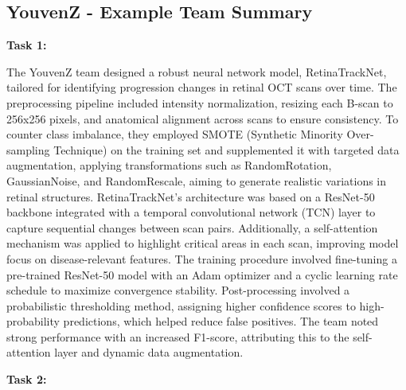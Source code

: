 \documentclass{article}
\begin{document}
\subsection{YouvenZ - Example Team Summary}

\textbf{Task 1:}

The YouvenZ team designed a robust neural network model, RetinaTrackNet, tailored for identifying progression changes in retinal OCT scans over time. The preprocessing pipeline included intensity normalization, resizing each B-scan to 256x256 pixels, and anatomical alignment across scans to ensure consistency. To counter class imbalance, they employed SMOTE (Synthetic Minority Over-sampling Technique) on the training set and supplemented it with targeted data augmentation, applying transformations such as RandomRotation, GaussianNoise, and RandomRescale, aiming to generate realistic variations in retinal structures.
RetinaTrackNet’s architecture was based on a ResNet-50 backbone integrated with a temporal convolutional network (TCN) layer to capture sequential changes between scan pairs. Additionally, a self-attention mechanism was applied to highlight critical areas in each scan, improving model focus on disease-relevant features. The training procedure involved fine-tuning a pre-trained ResNet-50 model with an Adam optimizer and a cyclic learning rate schedule to maximize convergence stability. Post-processing involved a probabilistic thresholding method, assigning higher confidence scores to high-probability predictions, which helped reduce false positives. The team noted strong performance with an increased F1-score, attributing this to the self-attention layer and dynamic data augmentation.


\textbf{Task 2:} 
\end{document}
